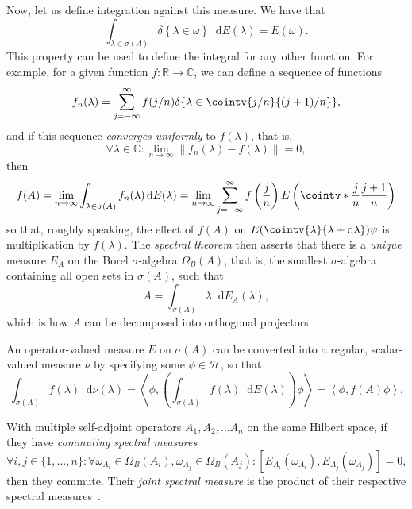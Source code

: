 \documentclass[10pt, a4paper]{article}
\numberwithin{equation}{section} %
\theoremstyle{definition}
\theoremstyle{plain}
\newcommand{\norm}[1]{\left\lVert#1\right\rVert}
\newcommand{\dif}{\mathop{}\!\mathrm{d}} %
\newcommand{\dintv}[2]{\mathopen\{#1,\ldots,#2\mathclose\}}
\newcommand{\?}{\mathrel{?}} %
\newcommand{\R}{\mathbb{R}} %
\newcommand{\C}{\mathbb{C}} %
\newcommand{\angleb}[1]{\left\langle #1 \right\rangle} %
\newcommand{\indic}[1]{\delta{\left\{#1\right\}}} %
\newcommand{\Hs}{\mathcal{H}} %
\begin{document}
\begin{appendices}
      Now, let us define integration against this measure. We have that
      \[ \int_{\lambda \in \sigma(A)} \indic{\lambda \in \omega} \dif{E(\lambda)} = E(\omega). \]
      This property can be used to define the integral for any other function. For example, for a given function \(f : \R \to \C\), we can define a sequence of functions
      \[ f_n(\lambda) = \sum_{j = -\infty}^{\infty} f(j/n) \indic{\lambda \in \cointv{j/n}{(j+1)/n}}, \]
      and if this sequence \emph{converges uniformly} to \(f(\lambda)\), that is,
      \[ \forall \lambda \in \C : \lim_{n \to \infty} \norm{f_n(\lambda) - f(\lambda)} = 0, \]
      then
      \[ f(A) = \lim_{n\to\infty} \int_{\lambda \in \sigma(A)} f_n(\lambda) \dif{E(\lambda)} = \lim_{n\to\infty} \sum_{j = -\infty}^{\infty} f\left(\frac{j}{n}\right) E\left(\cointv*{\frac{j}{n}}{\frac{j+1}{n}}\right) \]
      so that, roughly speaking, the effect of \(f(A)\) on \(E(\cointv{\lambda}{\lambda+\dif{\lambda}})\psi\) is multiplication by \(f(\lambda)\). The \emph{spectral theorem} then asserts that there is a \emph{unique} measure \(E_A\) on the Borel \(\sigma\)-algebra \(\Omega_B(A)\), that is, the smallest \(\sigma\)-algebra containing all open sets in \(\sigma(A)\), such that
      \[ A = \int_{\sigma(A)} \lambda \dif{E_A(\lambda)}, \]
      which is how \(A\) can be decomposed into orthogonal projectors.

      An operator-valued measure \(E\) on \(\sigma(A)\) can be converted into a regular, scalar-valued measure \(\nu\) by specifying some \(\phi \in \Hs\), so that
      \[ \int_{\sigma(A)} f(\lambda) \dif{\nu(\lambda)} = \angleb{\phi, \left(\int_{\sigma(A)} f(\lambda) \dif{E(\lambda)}\right) \phi} = \angleb{\phi, f(A) \phi}. \]

      With multiple self-adjoint operators \(A_1, A_2, \ldots A_n\) on the same Hilbert space, if they have \emph{commuting spectral measures}
      \[ \forall i, j \in \dintv{1}{n} : \forall \omega_{A_i} \in \Omega_B({A_i}), \omega_{A_j} \in \Omega_B({A_j}) : [E_{A_i}(\omega_{A_i}), E_{A_j}(\omega_{A_j})] = 0, \]
      then they commute. Their \emph{joint spectral measure} is the product of their respective spectral measures~\cite{SpectralTheoryQM}.


\end{appendices}
\end{document}
